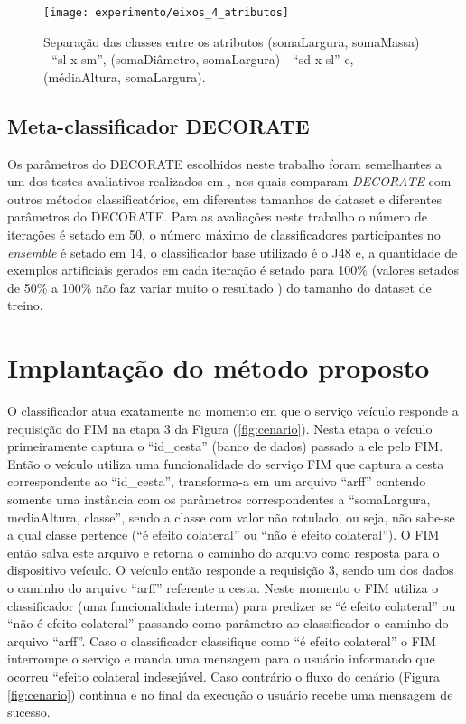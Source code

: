 \begin{figure}[!htb] \centering 
  \centering
  \texttt{[image: experimento/eixos\_4\_atributos]} 
  \caption{Separação das classes entre os atributos (somaLargura, somaMassa) - ``sl x sm'', (somaDiâmetro, somaLargura) - ``sd x sl'' e, (médiaAltura, somaLargura).} 
  \label{fig:eixos_4_atributos}
\end{figure}

\subsection{Meta-classificador DECORATE}
Os parâmetros do DECORATE escolhidos neste trabalho foram semelhantes a um dos testes avaliativos realizados em \cite{Melville:2004}, nos quais comparam \textit{DECORATE} com outros métodos classificatórios, em diferentes tamanhos de dataset e diferentes parâmetros do DECORATE. Para as avaliações neste trabalho o número de iterações é setado em 50, o número máximo de classificadores participantes no \textit{ensemble} é setado em 14, o classificador base utilizado é o J48 e, a quantidade de exemplos artificiais gerados em cada iteração é setado para 100\% (valores setados de 50\% a 100\% não faz variar muito o resultado \cite{Melville:2004}) do tamanho do dataset de treino.

\section{Implantação do método proposto}
\label{sec:implmetprop}
O classificador atua exatamente no momento em que o serviço veículo responde a requisição do FIM na etapa 3 da Figura (\ref{fig:cenario}). Nesta etapa o veículo primeiramente captura o ``id\_cesta'' (banco de dados) passado a ele pelo FIM. Então o veículo utiliza uma funcionalidade do serviço FIM que captura a cesta correspondente ao ``id\_cesta'', transforma-a em um arquivo ``arff'' contendo somente uma instância com os parâmetros correspondentes a ``somaLargura, mediaAltura, classe'', sendo a classe com valor não rotulado, ou seja, não sabe-se a qual classe pertence (``é efeito colateral'' ou ``não é efeito colateral''). O FIM então salva este arquivo e retorna o caminho do arquivo como resposta para o dispositivo veículo. O veículo então responde a requisição 3, sendo um dos dados o caminho do arquivo ``arff'' referente a cesta. Neste momento o FIM utiliza o classificador (uma funcionalidade interna) para predizer se ``é efeito colateral'' ou ``não é efeito colateral'' passando como parâmetro ao classificador o caminho do arquivo ``arff''. Caso o classificador classifique como ``é efeito colateral'' o FIM interrompe o serviço e manda uma mensagem para o usuário informando que ocorreu ``efeito colateral indesejável. Caso contrário o fluxo do cenário (Figura \ref{fig:cenario}) continua e no final da execução o usuário recebe uma mensagem de sucesso.
